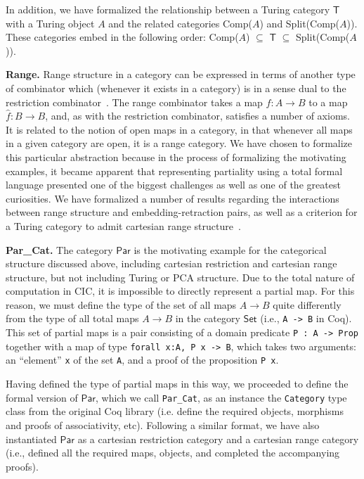 \documentclass{entcs} \usepackage{entcsmacro}
\begin{document}
In addition, we have formalized the relationship between a Turing category $\mathsf{T}$ with a Turing object $A$ and the related categories Comp($A$) and Split(Comp($A$)). These categories embed in the following order:
Comp($A$) $\subseteq$ $\mathsf{T}$ $\subseteq$ Split(Comp($A$)).

{\bfseries Range.} Range structure in a category can be expressed in terms of another type of combinator which (whenever it exists in a category) is in a sense dual to the restriction combinator~\cite{RangeI}. The range combinator takes a map $f : A \to B$ to a map $\hat{f} : B \to B$, and, as with the restriction combinator, satisfies a number of axioms. It is related to the notion of open maps in a category, in that whenever all maps in a given category are open, it is a range category. We have chosen to formalize this particular abstraction because in the process of formalizing the motivating examples, %
it became apparent that representing partiality using a total formal language presented one of the biggest challenges as well as one of the greatest curiosities. We have formalized a number of results regarding the interactions between range structure and embedding-retraction pairs, as well as a criterion for a Turing category to admit cartesian range structure~\cite{MyThesis}.

{\bfseries Par\_Cat.} The category $\mathsf{Par}$ is the motivating example for the categorical structure discussed above, including cartesian restriction and cartesian range structure, but not including Turing or PCA structure. Due to the total nature of computation in CIC, it is impossible to directly represent a partial map. For this reason, we must define the type of the set of all maps $A \to B$ quite differently from the type of all total maps $A \to B$ in the category $\mathsf{Set}$ (i.e., {\tt A -> B} in Coq). This set of partial maps is a pair consisting of a domain predicate {\tt P : A -> Prop} together with a map of type {\tt forall x:A, P x -> B}, which takes two arguments: an ``element'' {\tt x} of the set {\tt A}, and a proof of the proposition {\tt P x}. 

Having defined the type of partial maps in this way, we proceeded to define the formal version of $\mathsf{Par}$, which we call {\tt Par\_Cat}, as an instance the {\tt Category} type class from the original Coq library (i.e. define the required objects, morphisms and proofs of associativity, etc). Following a similar format, we have also instantiated $\mathsf{Par}$ as a cartesian restriction category and a cartesian range category (i.e., defined all the required maps, objects, and completed the accompanying proofs).
\end{document}
